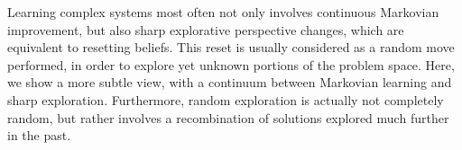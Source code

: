 Learning complex systems most often not only involves continuous Markovian improvement, but also sharp explorative perspective changes, which are equivalent to resetting beliefs. This reset is usually considered as a random move performed, in order to explore yet unknown portions of the problem space. Here, we show a more subtle view, with a continuum between Markovian learning and sharp exploration. Furthermore, random exploration is actually not completely random, but rather involves a recombination of solutions explored much further in the past.